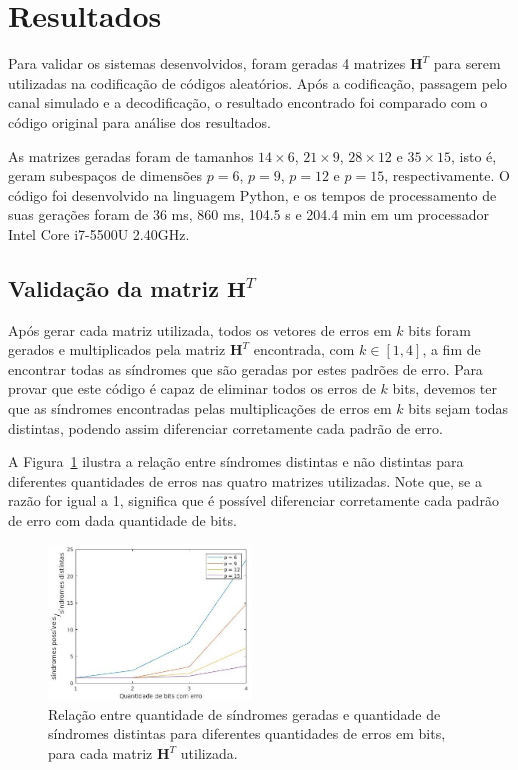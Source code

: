 \section{Resultados}
Para validar os sistemas desenvolvidos, foram geradas 4 matrizes $\textbf{H}^T$ para serem utilizadas na codificação de códigos aleatórios. Após a codificação, passagem pelo canal simulado e a decodificação, o resultado encontrado foi comparado com o código original para análise dos resultados.

As matrizes geradas foram de tamanhos $14 \times 6$, $21 \times 9$, $28 \times 12$ e $35 \times 15$, isto é, geram subespaços de dimensões $p = 6$, $p = 9$, $p = 12$ e $p = 15$, respectivamente. O código foi desenvolvido na linguagem Python, e os tempos de processamento de suas gerações foram de 36 ms, 860 ms, 104.5 s e 204.4 min em um processador Intel Core i7-5500U 2.40GHz.

\subsection{Validação da matriz $\textbf{H}^T$}

Após gerar cada matriz utilizada, todos os vetores de erros em $k$ bits foram gerados e multiplicados pela matriz $\textbf{H}^T$ encontrada, com $k \in [1,4]$, a fim de encontrar todas as síndromes que são geradas por estes padrões de erro. Para provar que este código é capaz de eliminar todos os erros de $k$ bits, devemos ter que as síndromes encontradas pelas multiplicações de erros em $k$ bits sejam todas distintas, podendo assim diferenciar corretamente cada padrão de erro.

A Figura~\ref{fig:sindromes} ilustra a relação entre síndromes distintas e não distintas para diferentes quantidades de erros nas quatro matrizes utilizadas. Note que, se a razão for igual a 1, significa que é possível diferenciar corretamente cada padrão de erro com dada quantidade de bits.

\begin{figure}[thpb]
  \centering
  \includegraphics[width=0.48\textwidth]{sections/sindromes_comparison.jpg}
  \caption{Relação entre quantidade de síndromes geradas e quantidade de síndromes distintas para diferentes quantidades de erros em bits, para cada matriz $\textbf{H}^T$ utilizada.}
  \label{fig:sindromes}
\end{figure}

